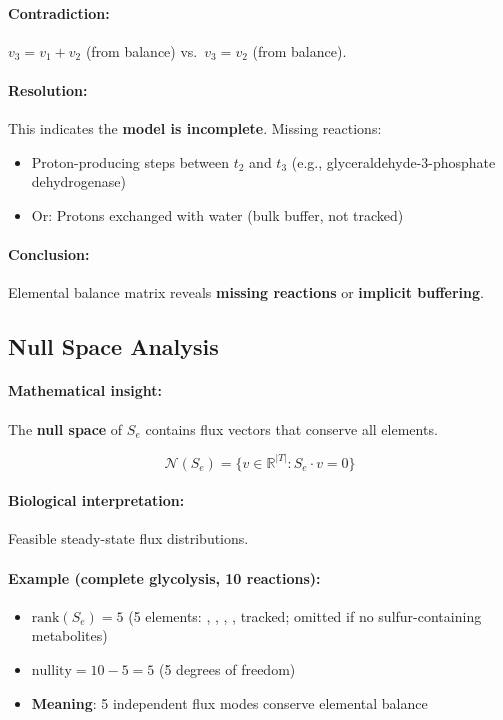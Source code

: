 \paragraph{Contradiction:} $v_3 = v_1 + v_2$ (from  balance) vs.\ $v_3 = v_2$ (from  balance).

\paragraph{Resolution:} This indicates the \textbf{model is incomplete}. Missing reactions:
\begin{itemize}
    \item Proton-producing steps between $t_2$ and $t_3$ (e.g., glyceraldehyde-3-phosphate dehydrogenase)
    \item Or: Protons exchanged with water (bulk buffer, not tracked)
\end{itemize}

\paragraph{Conclusion:} Elemental balance matrix reveals \textbf{missing reactions} or \textbf{implicit buffering}.

\subsection{Null Space Analysis}
\label{subsec:null-space-analysis}

\paragraph{Mathematical insight:} The \textbf{null space} of $S_e$ contains flux vectors that conserve all elements.

\begin{equation}
\mathcal{N}(S_e) = \{v \in \mathbb{R}^{|T|} : S_e \cdot v = 0\}
\end{equation}

\paragraph{Biological interpretation:} Feasible steady-state flux distributions.

\paragraph{Example (complete glycolysis, 10 reactions):}
\begin{itemize}
    \item $\text{rank}(S_e) = 5$ (5 elements: , , , ,  tracked;  omitted if no sulfur-containing metabolites)
    \item $\text{nullity} = 10 - 5 = 5$ (5 degrees of freedom)
    \item \textbf{Meaning}: 5 independent flux modes conserve elemental balance
\end{itemize}

